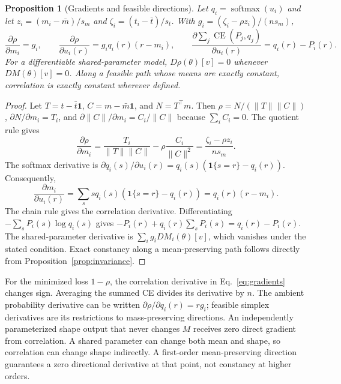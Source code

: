 \documentclass[11pt,letterpaper]{article}
\newtheorem{proposition}{Proposition}
\newcommand{\CE}{\operatorname{CE}}
\DeclareMathOperator{\softmax}{softmax}
\begin{document}
\begin{proposition}[Gradients and feasible directions]\label{prop:gradient}
Let $q_i=\softmax(u_i)$ and let $z_i=(m_i-\bar m)/s_m$ and $\zeta_i=(t_i-\bar t)/s_t$.
With $g_i=(\zeta_i-\rho z_i)/(n s_m)$,
\begin{equation}\label{eq:gradients}
 \frac{\partial\rho}{\partial m_i}=g_i,\qquad
 \frac{\partial\rho}{\partial u_i(r)}=g_i q_i(r)(r-m_i),\qquad
 \frac{\partial\sum_j\CE(P_j,q_j)}{\partial u_i(r)}=q_i(r)-P_i(r).
\end{equation}
For a differentiable shared-parameter model, $D\rho(\theta)[v]=0$ whenever $DM(\theta)[v]=0$.
Along a feasible path whose means are exactly constant, correlation is exactly constant wherever defined.
\end{proposition}
\begin{proof}
Let $T=t-\bar t\mathbf1$, $C=m-\bar m\mathbf1$, and $N=T^\top m$.
Then $\rho=N/(\|T\|\|C\|)$, $\partial N/\partial m_i=T_i$, and $\partial\|C\|/\partial m_i=C_i/\|C\|$ because $\sum_i C_i=0$.
The quotient rule gives
\[
 \frac{\partial\rho}{\partial m_i}=\frac{T_i}{\|T\|\|C\|}-\rho\frac{C_i}{\|C\|^2}=\frac{\zeta_i-\rho z_i}{n s_m}.
\]
The softmax derivative is $\partial q_i(s)/\partial u_i(r)=q_i(s)(\mathbf1\{s=r\}-q_i(r))$.
Consequently,
\[
 \frac{\partial m_i}{\partial u_i(r)}=\sum_s s q_i(s)(\mathbf1\{s=r\}-q_i(r))=q_i(r)(r-m_i).
\]
The chain rule gives the correlation derivative.
Differentiating $-\sum_sP_i(s)\log q_i(s)$ gives $-P_i(r)+q_i(r)\sum_sP_i(s)=q_i(r)-P_i(r)$.
The shared-parameter derivative is $\sum_i g_i DM_i(\theta)[v]$, which vanishes under the stated condition.
Exact constancy along a mean-preserving path follows directly from Proposition~\ref{prop:invariance}.
\end{proof}

For the minimized loss $1-\rho$, the correlation derivative in Eq.~\eqref{eq:gradients} changes sign.
Averaging the summed CE divides its derivative by $n$.
The ambient probability derivative can be written $\partial\rho/\partial q_i(r)=r g_i$; feasible simplex derivatives are its restrictions to mass-preserving directions.
An independently parameterized shape output that never changes $M$ receives zero direct gradient from correlation.
A shared parameter can change both mean and shape, so correlation can change shape indirectly.
A first-order mean-preserving direction guarantees a zero directional derivative at that point, not constancy at higher orders.
\end{document}
